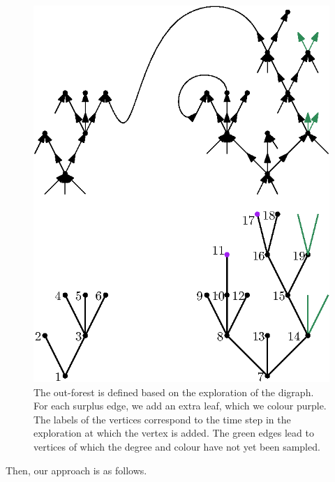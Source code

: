 \begin{figure}
    \centering
    \includegraphics[scale=0.8]{Content/Pictures/configuration_model_out_forest.eps}
    \caption{The out-forest is defined based on the exploration of the digraph. For each surplus edge, we add an extra leaf, which we colour purple. The labels of the vertices correspond to the time step in the exploration at which the vertex is added. The green edges lead to vertices of which the degree and colour have not yet been sampled.}
    \label{fig.configuration modeloutforest}
\end{figure}
Then, our approach is as follows.
